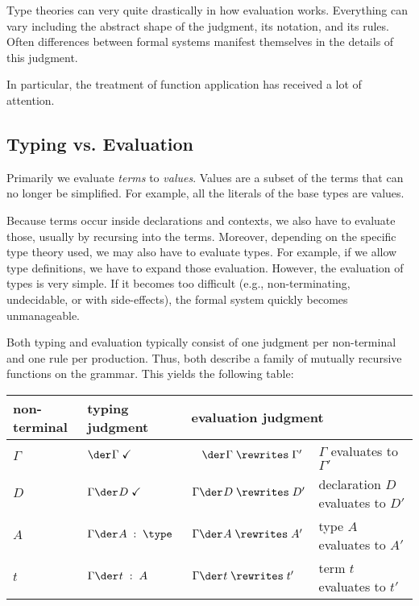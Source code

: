 Type theories can very quite drastically in how evaluation works.
Everything can vary including the abstract shape of the judgment, its notation, and its rules.
Often differences between formal systems manifest themselves in the details of this judgment.

In particular, the treatment of function application has received a lot of attention.

\subsection{Typing vs. Evaluation}

Primarily we evaluate \emph{terms} to \emph{values}.
Values are a subset of the terms that can no longer be simplified.
For example, all the literals of the base types are values.

Because terms occur inside declarations and contexts, we also have to evaluate those, usually by recursing into the terms.
Moreover, depending on the specific type theory used, we may also have to evaluate types.
For example, if we allow type definitions, we have to expand those evaluation.
However, the evaluation of types is very simple.
If it becomes too difficult (e.g., non-terminating, undecidable, or with side-effects), the formal system quickly becomes unmanageable.

Both typing and evaluation typically consist of one judgment per non-terminal and one rule per production.
Thus, both describe a family of mutually recursive functions on the grammar.
This yields the following table:

\begin{center}
	\begin{tabular}{|l|l|l|l|}
	\hline
	non-terminal & typing judgment & \multicolumn{2}{l|}{evaluation judgment} \\
	  \hline\hline
		$\Gamma$ & $\iscont{}{\Gamma}$ & $\;\;\;\evcont{}{\Gamma}{\Gamma'}$           & $\Gamma$ evaluates to $\Gamma'$\\
		$D$ & $\isdecl{}{\Gamma}{D}$ & $\evdec{}{\Gamma}{D}{D'}$        & declaration $D$ evaluates to $D'$ \\
		$A$ & $\oftype{}{\Gamma}{A}{\type}$ & $\evobj{}{\Gamma}{A}{A'}$        & type $A$ evaluates to $A'$ \\
		$t$ & $\oftype{}{\Gamma}{t}{A}$ & $\evobj{}{\Gamma}{t}{t'}$        & term $t$ evaluates to $t'$ \\
		\hline
	\end{tabular}
\end{center}


